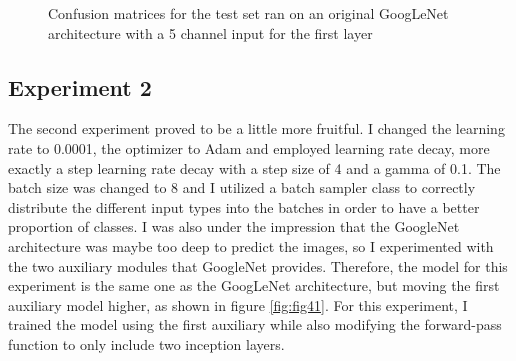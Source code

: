 \begin{figure}[!ht]
    \caption{Confusion matrices for the test set ran on an original GoogLeNet architecture with a 5 channel input for the first layer}
    \label{fig:fig9}
\end{figure}

\subsection{Experiment 2}

The second experiment proved to be a little more fruitful. I changed the learning rate to 0.0001, the optimizer to Adam and employed learning rate decay, more exactly a step learning rate decay with a step size of 4 and a gamma of 0.1. The batch size was changed to 8 and I utilized a batch sampler class to correctly distribute the different input types into the batches in order to have a better proportion of classes. I was also under the impression that the GoogleNet architecture was maybe too deep to predict the images, so I experimented with the two auxiliary modules that GoogleNet provides. Therefore, the model for this experiment is the same one as the GoogLeNet architecture, but moving the first auxiliary model higher, as shown in figure \ref{fig:fig41}. For this experiment, I trained the model using the first auxiliary while also modifying the forward-pass function to only include two inception layers.

